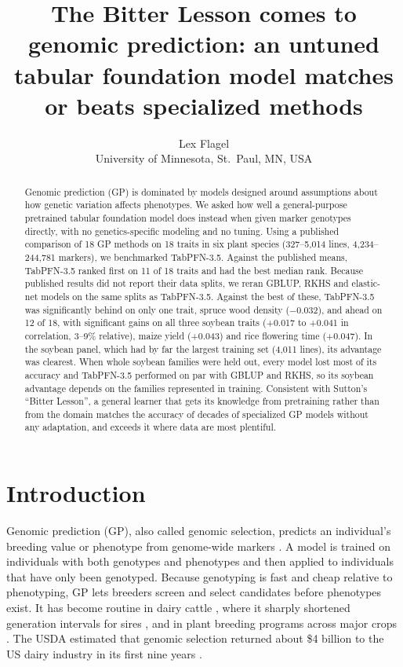\documentclass[11pt]{article}
\title{The Bitter Lesson comes to genomic prediction: an untuned tabular foundation model matches or beats specialized methods}
\author{Lex Flagel\\[2pt]\small University of Minnesota, St.\ Paul, MN, USA}
\date{}
\begin{document}
\maketitle

\begin{abstract}
Genomic prediction (GP) is dominated by models designed around assumptions about how genetic variation affects phenotypes. We asked how well a general-purpose pretrained tabular foundation model does instead when given marker genotypes directly, with no genetics-specific modeling and no tuning. Using a published comparison of 18 GP methods on 18 traits in six plant species (327--5,014 lines, 4,234--244,781 markers), we benchmarked TabPFN-3.5. Against the published means, TabPFN-3.5 ranked first on 11 of 18 traits and had the best median rank. Because published results did not report their data splits, we reran GBLUP, RKHS and elastic-net models on the same splits as TabPFN-3.5. Against the best of these, TabPFN-3.5 was significantly behind on only one trait, spruce wood density (−0.032), and ahead on 12 of 18, with significant gains on all three soybean traits (+0.017 to +0.041 in correlation, 3--9\% relative), maize yield (+0.043) and rice flowering time (+0.047). In the soybean panel, which had by far the largest training set (4,011 lines), its advantage was clearest. When whole soybean families were held out, every model lost most of its accuracy and TabPFN-3.5 performed on par with GBLUP and RKHS, so its soybean advantage depends on the families represented in training. Consistent with Sutton's ``Bitter Lesson'', a general learner that gets its knowledge from pretraining rather than from the domain matches the accuracy of decades of specialized GP models without any adaptation, and exceeds it where data are most plentiful.
\end{abstract}

\section{Introduction}

Genomic prediction (GP), also called genomic selection, predicts an individual's breeding value or phenotype from genome-wide markers \citep{meuwissen2001}. A model is trained on individuals with both genotypes and phenotypes and then applied to individuals that have only been genotyped. Because genotyping is fast and cheap relative to phenotyping, GP lets breeders screen and select candidates before phenotypes exist. It has become routine in dairy cattle \citep{hayes2009,wiggans2017}, where it sharply shortened generation intervals for sires \citep{garciaruiz2016}, and in plant breeding programs across major crops \citep{heffner2009,crossa2017}. The USDA estimated that genomic selection returned about \$4 billion to the US dairy industry in its first nine years \citep{rexroad2019}.
\end{document}
